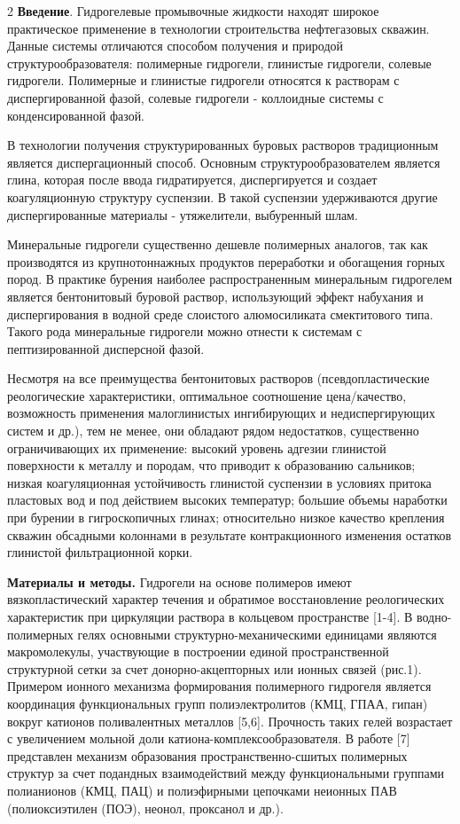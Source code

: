 \begin{multicols}{2}
{\bfseries Введение}. Гидрогелевые промывочные жидкости находят широкое
практическое применение в технологии строительства нефтегазовых скважин.
Данные системы отличаются способом получения и природой
структурообразователя: полимерные гидрогели, глинистые гидрогели,
солевые гидрогели. Полимерные и глинистые гидрогели относятся к
растворам с диспергированной фазой, солевые гидрогели - коллоидные
системы с конденсированной фазой.

В технологии получения структурированных буровых растворов традиционным
является диспергационный способ. Основным структурообразователем
является глина, которая после ввода гидратируется, диспергируется и
создает коагуляционную структуру суспензии. В такой суспензии
удерживаются другие диспергированные материалы - утяжелители, выбуренный
шлам.

Минеральные гидрогели существенно дешевле полимерных аналогов, так как
производятся из крупнотоннажных продуктов переработки и обогащения
горных пород. В практике бурения наиболее распространенным минеральным
гидрогелем является бентонитовый буровой раствор, использующий эффект
набухания и диспергирования в водной среде слоистого алюмосиликата
смектитового типа. Такого рода минеральные гидрогели можно отнести к
системам с пептизированной дисперсной фазой.

Несмотря на все преимущества бентонитовых растворов (псевдопластические
реологические характеристики, оптимальное соотношение цена/качество,
возможность применения малоглинистых ингибирующих и недиспергирующих
систем и др.), тем не менее, они обладают рядом недостатков, существенно
ограничивающих их применение: высокий уровень адгезии глинистой
поверхности к металлу и породам, что приводит к образованию сальников;
низкая коагуляционная устойчивость глинистой суспензии в условиях
притока пластовых вод и под действием высоких температур; большие объемы
наработки при бурении в гигроскопичных глинах; относительно низкое
качество крепления скважин обсадными колоннами в результате
контракционного изменения остатков глинистой фильтрационной корки.

{\bfseries Материалы и методы.} Гидрогели на основе полимеров имеют
вязкопластический характер течения и обратимое восстановление
реологических характеристик при циркуляции раствора в кольцевом
пространстве {[}1-4{]}. В водно-полимерных гелях основными
структурно-механическими единицами являются макромолекулы, участвующие в
построении единой пространственной структурной сетки за счет
донорно-акцепторных или ионных связей (рис.1). Примером ионного
механизма формирования полимерного гидрогеля является координация
функциональных групп полиэлектролитов (КМЦ, ГПАА, гипан) вокруг катионов
поливалентных металлов {[}5,6{]}. Прочность таких гелей возрастает с
увеличением мольной доли катиона-комплексообразователя. В работе {[}7{]}
представлен механизм образования пространственно-сшитых полимерных
структур за счет подандных взаимодействий между функциональными группами
полианионов (КМЦ, ПАЦ) и полиэфирными цепочками неионных ПАВ
(полиоксиэтилен (ПОЭ), неонол, проксанол и др.).
\end{multicols}

